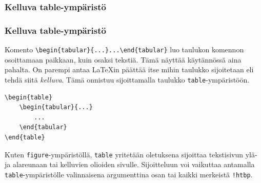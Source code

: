 \subsubsection{Kelluva table-ympäristö}
\begin{frame}[fragile]
    \frametitle{Kelluva table-ympäristö}
Komento \verb-\begin{tabular}{...}...\end{tabular}- luo taulukon komennon osoittamaan paikkaan, kuin osaksi tekstiä. Tämä näyttää käytännössä aina pahalta. 
    \vaihto
    On parempi antaa \LaTeX in päättää itse mihin taulukko sijoitetaan eli tehdä siitä \emph{kelluva}. Tämä onnistuu sijoittamalla taulukko \verb-table--ympäristöön.
    \begin{Verbatim}[frame=single]
\begin{table}
    \begin{tabular}{...}
        ...
    \end{tabular}
\end{table}
    \end{Verbatim}
    Kuten \verb-figure--ympäristöllä, \verb-table- yritetään oletuksena sijoittaa tekstisivun ylä- ja alareunaan tai kelluvien olioiden sivulle. Sijoitteluun voi vaikuttaa antamalla \verb-table--ympäristölle valinnaisena argumenttina osan tai kaikki merkeistä \verb-!htbp-.
\end{frame}
%
%
\begin{frame}[fragile]
    

\end{frame}
